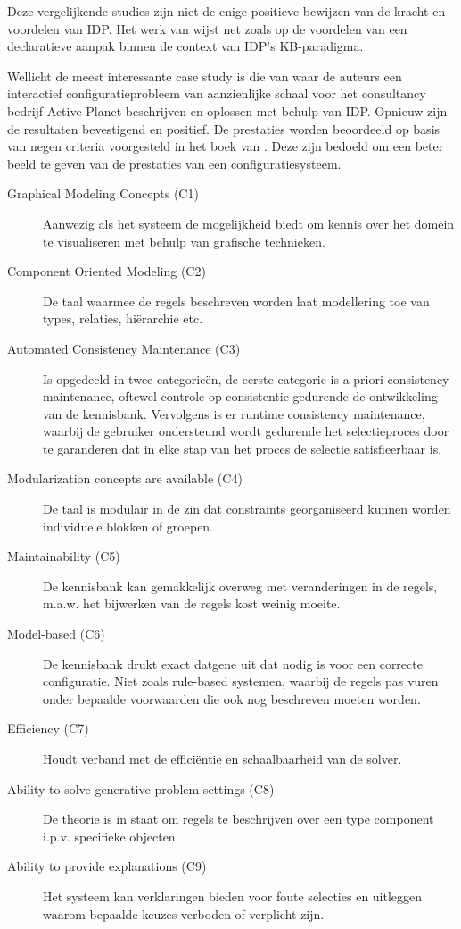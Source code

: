 Deze vergelijkende studies zijn niet de enige positieve bewijzen van de kracht en voordelen van IDP. Het werk van \citet{vlaeminck2009logical} wijst net zoals \cite{gelle1996interactive} op de voordelen van een declaratieve aanpak binnen de context van IDP's KB-paradigma.

Wellicht de meest interessante case study is die van \citet{van2016kb} waar de auteurs een interactief configuratieprobleem van aanzienlijke schaal voor het consultancy bedrijf Active Planet beschrijven en oplossen met behulp van IDP. Opnieuw zijn de resultaten bevestigend en positief. De prestaties worden beoordeeld op basis van negen criteria voorgesteld in het boek van \citet{felfernig2014knowledge}. Deze zijn bedoeld om een beter beeld te geven van de prestaties van een configuratiesysteem. 
\begin{description}
\item[Graphical Modeling Concepts (C1)] Aanwezig als het systeem de mogelijkheid biedt om kennis over het domein te visualiseren met behulp van grafische technieken.
\item[Component Oriented Modeling (C2)] De taal waarmee de regels beschreven worden laat modellering toe van types, relaties, hi\"{e}rarchie etc.
\item[Automated Consistency Maintenance (C3)] Is opgedeeld in twee categorie\"{e}n, de eerste categorie is a priori consistency maintenance, oftewel controle op consistentie gedurende de ontwikkeling van de kennisbank. Vervolgens is er runtime consistency maintenance, waarbij de gebruiker ondersteund wordt gedurende het selectieproces door te garanderen dat in elke stap van het proces de selectie satisfieerbaar is.
\item[Modularization concepts are available (C4)] De taal is modulair in de zin dat constraints georganiseerd kunnen worden individuele blokken of groepen.
\item[Maintainability (C5)] De kennisbank kan gemakkelijk overweg met veranderingen in de regels, m.a.w. het bijwerken van de regels kost weinig moeite. 
\item[Model-based (C6)] De kennisbank drukt exact datgene uit dat nodig is voor een correcte configuratie. Niet zoals rule-based systemen, waarbij de regels pas vuren onder bepaalde voorwaarden die ook nog beschreven moeten worden.
\item[Efficiency (C7)] Houdt verband met de effici\"{e}ntie en schaalbaarheid van de solver.
\item[Ability to solve generative problem settings (C8)] De theorie is in staat om regels te beschrijven over een type component i.p.v. specifieke objecten.
\item[Ability to provide explanations (C9)] Het systeem kan verklaringen bieden voor foute selecties en uitleggen waarom bepaalde keuzes verboden of verplicht zijn.
\end{description}

